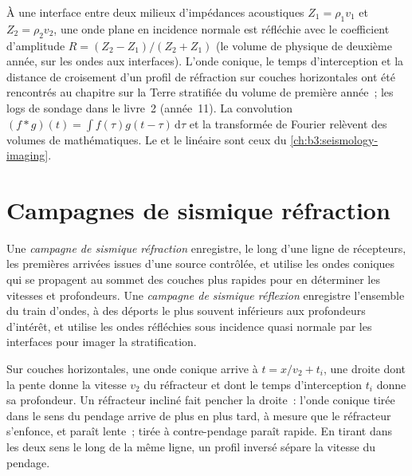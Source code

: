 \begin{recall}
À une interface entre deux milieux d'impédances acoustiques $Z_1 = \rho_1v_1$ et
$Z_2 = \rho_2v_2$, une onde plane en incidence normale est réfléchie avec le
coefficient d'amplitude $R = (Z_2 - Z_1)/(Z_2 + Z_1)$ (le volume de physique de
deuxième année, sur les ondes aux interfaces). L'onde conique, le temps d'interception et
la distance de croisement d'un profil de réfraction sur couches horizontales ont été
rencontrés au chapitre sur la Terre stratifiée du volume de première année~; les logs de sondage dans le livre~2
(année~11). La convolution $(f*g)(t) = \int f(\tau)g(t - \tau)\,\mathrm d\tau$
et la transformée de Fourier relèvent des volumes de mathématiques. Le  et le
 linéaire sont ceux du \cref{ch:b3:seismology-imaging}.
\end{recall}

\section{Campagnes de sismique réfraction}

\begin{definition}\label{def:b3:exploration-seismology:surveys}
Une \emph{campagne de sismique réfraction} enregistre, le long
d'une ligne de récepteurs, les premières arrivées issues d'une source contrôlée, et utilise les
ondes coniques qui se propagent au sommet des couches plus rapides pour en déterminer les vitesses et
profondeurs. Une \emph{campagne de sismique réflexion}
enregistre l'ensemble du train d'ondes, à des déports le plus souvent inférieurs aux profondeurs
d'intérêt, et utilise les ondes réfléchies sous incidence quasi normale par les
interfaces pour imager la stratification.
\end{definition}

Sur couches horizontales, une onde conique arrive à $t = x/v_2 + t_i$, une droite
dont la pente donne la vitesse $v_2$ du réfracteur et dont le temps d'interception $t_i$
donne sa profondeur. Un réfracteur incliné fait pencher la droite~: l'onde conique tirée
dans le sens du pendage arrive de plus en plus tard, à mesure que le réfracteur s'enfonce, et paraît lente~;
tirée à contre-pendage paraît rapide. En tirant dans les deux sens le long de la même ligne, un
profil inversé sépare la vitesse du pendage.

